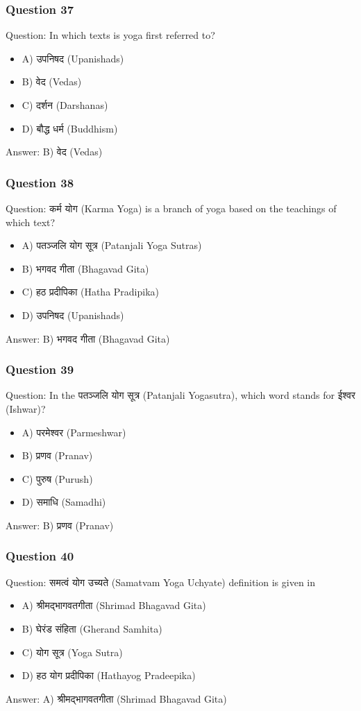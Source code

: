 \begin{frame}[fragile]\frametitle{Question 37}
Question: In which texts is yoga first referred to?
\begin{itemize}
\item A) उपनिषद (Upanishads)
\item B) वेद (Vedas)
\item C) दर्शन (Darshanas)
\item D) बौद्ध धर्म (Buddhism)
\end{itemize}
Answer: B) वेद (Vedas)
\end{frame}

\begin{frame}[fragile]\frametitle{Question 38}
Question: कर्म योग (Karma Yoga) is a branch of yoga based on the teachings of which text?
\begin{itemize}
\item A) पतञ्जलि योग सूत्र (Patanjali Yoga Sutras)
\item B) भगवद गीता (Bhagavad Gita)
\item C) हठ प्रदीपिका (Hatha Pradipika)
\item D) उपनिषद (Upanishads)
\end{itemize}
Answer: B) भगवद गीता (Bhagavad Gita)
\end{frame}

\begin{frame}[fragile]\frametitle{Question 39}
Question: In the पतञ्जलि योग सूत्र (Patanjali Yogasutra), which word stands for ईश्वर (Ishwar)?
\begin{itemize}
\item A) परमेश्वर (Parmeshwar)
\item B) प्रणव (Pranav)
\item C) पुरुष (Purush)
\item D) समाधि (Samadhi)
\end{itemize}
Answer: B) प्रणव (Pranav)
\end{frame}

\begin{frame}[fragile]\frametitle{Question 40}
Question: समत्वं योग उच्यते (Samatvam Yoga Uchyate) definition is given in
\begin{itemize}
\item A) श्रीमद्भागवतगीता (Shrimad Bhagavad Gita)
\item B) घेरंड संहिता (Gherand Samhita)
\item C) योग सूत्र (Yoga Sutra)
\item D) हठ योग प्रदीपिका (Hathayog Pradeepika)
\end{itemize}
Answer: A) श्रीमद्भागवतगीता (Shrimad Bhagavad Gita)
\end{frame}


